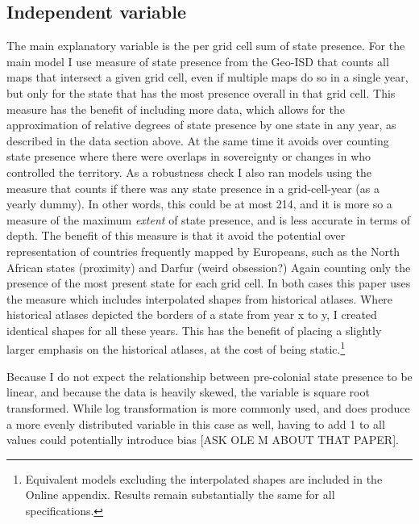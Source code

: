 \documentclass[12pt]{article}
\begin{document}

\subsection{Independent variable}

The main explanatory variable is the per grid cell sum of state presence. For
the main model I use measure of state presence from the Geo-ISD that counts all
maps that intersect a given grid cell, even if multiple maps do so in a single
year, but only for the state that has the most presence overall in that grid
cell. This measure has the benefit of including more data, which allows for the
approximation of relative degrees of state presence by one state in any year, as
described in the data section above. At the same time it avoids over counting
state presence where there were overlaps in sovereignty or changes in who
controlled the territory. As a robustness check I also ran models using the
measure that counts if there was any state presence in a grid-cell-year (as a
yearly dummy). In other words, this could be at most 214, and it is more so a
measure of the maximum \textit{extent} of state presence, and is less accurate
in terms of depth. The benefit of this measure is that it avoid the potential
over representation of countries frequently mapped by Europeans, such as the
North African states (proximity) and Darfur (weird obsession?) Again counting
only the presence of the most present state for each grid cell. In both cases
this paper uses the measure which includes interpolated shapes from historical
atlases. Where historical atlases depicted the borders of a state from year x to
y, I created identical shapes for all these years. This has the benefit of
placing a slightly larger emphasis on the historical atlases, at the cost of
being static.\footnote{Equivalent models excluding the interpolated shapes are
included in the Online appendix. Results remain substantially the same for all
specifications.}

Because I do not expect the relationship between pre-colonial state presence to
be linear, and because the data is heavily skewed, the variable is square root
transformed. While log transformation is more commonly used, and does produce a
more evenly distributed variable in this case as well, having to add 1 to
all values could potentially introduce bias [ASK OLE M ABOUT THAT PAPER]. 
\end{document}
